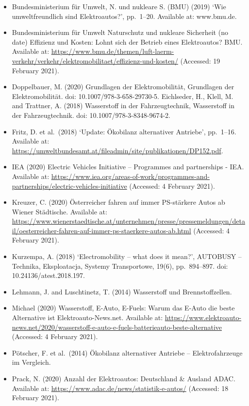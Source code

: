 \documentclass[
]{book}
\providecommand{\tightlist}{%
  \setlength{\itemsep}{0pt}\setlength{\parskip}{0pt}}
\begin{document}
\begin{itemize}
\tightlist
\item
  Bundesministerium für Umwelt, N. und nukleare S. (BMU) (2019) `Wie umweltfreundlich sind Elektroautos?', pp.~1--20. Available at: www.bmu.de.
\item
  Bundesministerium für Umwelt Naturschutz und nukleare Sicherheit (no date) Effizienz und Kosten: Lohnt sich der Betrieb eines Elektroautos? \textbar{} BMU. Available at: \url{https://www.bmu.de/themen/luft-laerm-verkehr/verkehr/elektromobilitaet/effizienz-und-kosten/} (Accessed: 19 February 2021).
\item
  Doppelbauer, M. (2020) Grundlagen der Elektromobilität, Grundlagen der Elektromobilität. doi: 10.1007/978-3-658-29730-5.
  Eichlseder, H., Klell, M. and Trattner, A. (2018) Wasserstoff in der Fahrzeugtechnik, Wasserstoff in der Fahrzeugtechnik. doi: 10.1007/978-3-8348-9674-2.
\item
  Fritz, D. et al.~(2018) `Update: Ökobilanz alternativer Antriebe', pp.~1--16. Available at: \url{https://umweltbundesamt.at/fileadmin/site/publikationen/DP152.pdf}.
\item
  IEA (2020) Electric Vehicles Initiative -- Programmes and partnerships - IEA. Available at: \url{https://www.iea.org/areas-of-work/programmes-and-partnerships/electric-vehicles-initiative} (Accessed: 4 February 2021).
\item
  Kreuzer, C. (2020) Österreicher fahren auf immer PS-stärkere Autos ab \textbar{} Wiener Städtische. Available at: \url{https://www.wienerstaedtische.at/unternehmen/presse/pressemeldungen/detail/oesterreicher-fahren-auf-immer-ps-staerkere-autos-ab.html} (Accessed: 4 February 2021).
\item
  Kurzempa, A. (2018) `Electromobility -- what does it mean?', AUTOBUSY -- Technika, Eksploatacja, Systemy Transportowe, 19(6), pp.~894--897. doi: 10.24136/atest.2018.197.
\item
  Lehmann, J. and Luschtinetz, T. (2014) Wasserstoff und Brennstoffzellen.
\item
  Michael (2020) Wasserstoff, E-Auto, E-Fuels: Warum das E-Auto die beste Alternative ist \textbar{} Elektroauto-News.net. Available at: \url{https://www.elektroauto-news.net/2020/wasserstoff-e-auto-e-fuels-batterieauto-beste-alternative} (Accessed: 4 February 2021).
\item
  Pötscher, F. et al.~(2014) Ökobilanz alternativer Antriebe -- Elektrofahrzeuge im Vergleich.
\item
  Prack, N. (2020) Anzahl der Elektroautos: Deutschland \& Ausland \textbar{} ADAC. Available at: \url{https://www.adac.de/news/statistik-e-autos/} (Accessed: 18 February 2021).

\end{itemize}
\end{document}
